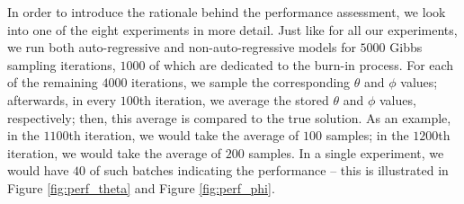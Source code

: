 \documentclass{mpaper}
\begin{document}
\par In order to introduce the rationale behind the performance assessment, we look into one of the eight experiments in more detail. Just like for all our experiments, we run both auto-regressive and non-auto-regressive models for $5000$ Gibbs sampling iterations, $1000$ of which are dedicated to the burn-in process. For each of the remaining $4000$ iterations, we sample the corresponding $\theta$ and $\phi$ values; afterwards, in every $100$th iteration, we average the stored $\theta$ and $\phi$ values, respectively; then, this average is compared to the true solution. As an example, in the $1100$th iteration, we would take the average of $100$ samples; in the $1200$th iteration, we would take the average of $200$ samples. In a single experiment, we would have $40$ of such batches indicating the performance -- this is illustrated in Figure \ref{fig:perf_theta} and Figure \ref{fig:perf_phi}.
\end{document}
